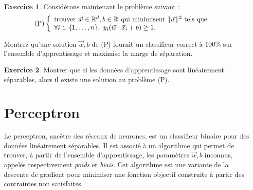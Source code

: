 \documentclass[a4paper,francais]{article}
\newcommand{\R}{{\ensuremath\mathbb{R}}}
\theoremstyle{definition}
\newtheorem{exercice}{Exercice}[section]
\begin{document}
\begin{exercice}
  Considérons maintenant le problème suivant : 
\[
\text{(P)}
\left\{
\begin{array}{ll}
  \text{trouver} \ \vec{w} \in \R^{d}, b\in\R \ \text{qui minimisent} \ \|\vec{w}\|^2 \ \text{tels que} & \\
  \forall i \in \{1,\dots,n\}, \ y_i(\vec{w} \cdot \vec{x}_i + b) \geq 1. 
\end{array}
\right.
\]

Montrez qu'une solution $\vec{w}, b$ de (P)  fournit un classifieur
correct à $100\%$ sur l'ensemble d'apprentissage et maximise la marge de séparation.   
\end{exercice}

\begin{exercice}
  Montrer que si les données d'apprentissage sont linéairement séparables,
  alors il existe une solution au problème (P).
\end{exercice}

\section{Perceptron}
\label{sec:perceptron}

Le perceptron, ancêtre des réseaux de neurones, est un classifieur binaire pour des
données linéairement séparables. Il est associé à un algorithme qui permet de trouver,
à partir de l'ensemble d'apprentissage, les paramètres $\vec{w},b$ inconnus, appelés
respectivement \emph{poids} et \emph{biais}. Cet algorithme est une variante de la
descente de gradient pour minimiser une fonction objectif construite à partir des
contraintes non satisfaites.
\end{document}
